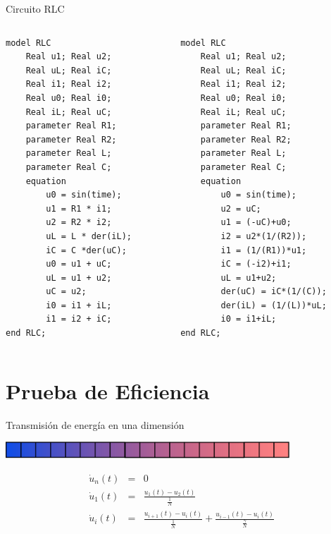 \begin{frame}[fragile]{Circuito RLC}
   \fontsize{8pt}{7.2}\selectfont
    \begin{columns}
        \begin{column}{0.5\textwidth}
        \begin{lstlisting}[language=Modelica]
model RLC
    Real u1; Real u2;
    Real uL; Real iC;
    Real i1; Real i2;
    Real u0; Real i0;
    Real iL; Real uC;
    parameter Real R1;
    parameter Real R2;
    parameter Real L;
    parameter Real C;
    equation
        u0 = sin(time);
        u1 = R1 * i1;
        u2 = R2 * i2;
        uL = L * der(iL);
        iC = C *der(uC);
        u0 = u1 + uC;
        uL = u1 + u2;
        uC = u2;
        i0 = i1 + iL;
        i1 = i2 + iC;
end RLC;
        \end{lstlisting}
        \end{column}
        \begin{column}{0.5\textwidth}
        \begin{lstlisting}[language=Modelica]
model RLC
    Real u1; Real u2;
    Real uL; Real iC;
    Real i1; Real i2;
    Real u0; Real i0;
    Real iL; Real uC;
    parameter Real R1;
    parameter Real R2;
    parameter Real L;
    parameter Real C;
    equation
        u0 = sin(time);
        u2 = uC;
        u1 = (-uC)+u0;
        i2 = u2*(1/(R2));
        i1 = (1/(R1))*u1;
        iC = (-i2)+i1;
        uL = u1+u2;
        der(uC) = iC*(1/(C));
        der(iL) = (1/(L))*uL;
        i0 = i1+iL;
end RLC;
        \end{lstlisting}
        \end{column}
    \end{columns}
\end{frame}

\section{Prueba de Eficiencia}

\begin{frame}{Transmisión de energía en una dimensión}
    \begin{center}
        \includegraphics[width=0.8\textwidth]{graphics/heat_transfer.eps}
    \end{center}
    \pause
    \begin{eqnarray*}
        \dot{u}_{n}(t) & = & 0\\
        \dot{u}_{1}(t) & = & \frac{u_{1}(t)-u_{2}(t)}{\frac{1}{N}}\\
        \dot{u}_{i}(t) & = & \frac{u_{i+1}(t)-u_{i}(t)}{\frac{1}{N}}+\frac{u_{i-1}(t)-u_{i}(t)}{\frac{\gamma}{N}}\;
    \end{eqnarray*}
\end{frame}

